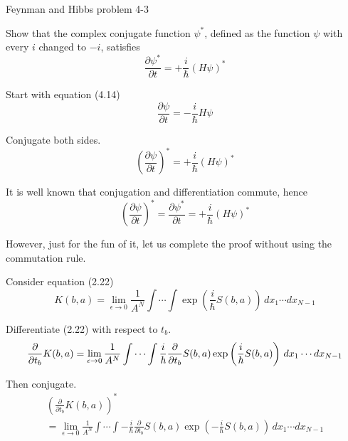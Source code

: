 \documentclass[12pt]{article}
\begin{document}
\begin{center}
Feynman and Hibbs problem 4-3
\end{center}

Show that the complex conjugate function $\psi^*$,
defined as the function $\psi$ with every $i$ changed to $-i$,
satisfies
\begin{equation*}
\frac{\partial\psi^*}{\partial t}=+\frac{i}{\hbar}(H\psi)^*
\end{equation*}

Start with equation (4.14)
\begin{equation*}
\frac{\partial\psi}{\partial t}=-\frac{i}{\hbar}H\psi
\end{equation*}

Conjugate both sides.
\begin{equation*}
\left(\frac{\partial\psi}{\partial t}\right)^*=+\frac{i}{\hbar}(H\psi)^*
\end{equation*}

It is well known that conjugation and differentiation commute, hence
\begin{equation*}
\left(\frac{\partial\psi}{\partial t}\right)^*=\frac{\partial\psi^*}{\partial t}=+\frac{i}{\hbar}(H\psi)^*
\end{equation*}

However, just for the fun of it, let us complete the proof without using the commutation rule.

\bigskip
Consider equation (2.22)
\begin{equation*}
K(b,a)=\lim_{\epsilon\rightarrow0}\frac{1}{A^N}\int\cdots\int
\exp\left(\frac{i}{\hbar}S(b,a)\right)\,dx_1\cdots dx_{N-1}
\end{equation*}

Differentiate (2.22) with respect to $t_b$.
\begin{equation*}
\frac{\partial}{\partial t_b}K(b,a)
\\
=
\lim_{\epsilon\rightarrow0}\frac{1}{A^N}
\int\cdots\int
\frac{i}{\hbar}\frac{\partial}{\partial t_b}S(b,a)
\exp\left(\frac{i}{\hbar}S(b,a)\right)\,dx_1\cdots dx_{N-1}
\end{equation*}

Then conjugate.
\begin{multline*}
\left(\frac{\partial}{\partial t_b}K(b,a)\right)^*
\\
=\lim_{\epsilon\rightarrow0}\frac{1}{A^N}
\int\cdots\int
-\frac{i}{\hbar}\frac{\partial}{\partial t_b}S(b,a)
\exp\left(-\frac{i}{\hbar}S(b,a)\right)\,dx_1\cdots dx_{N-1}
\end{multline*}
\end{document}
